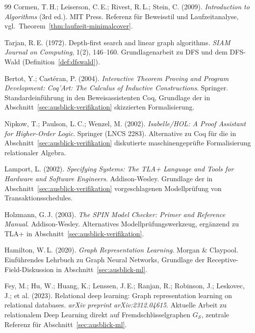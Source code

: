 ﻿\documentclass[a4paper,12pt]{report}
\theoremstyle{definition}
\theoremstyle{remark}
\begin{document}
\begin{thebibliography}{99}
Cormen, T.\,H.; Leiserson, C.\,E.; Rivest, R.\,L.; Stein, C. (2009).
\newblock \emph{Introduction to Algorithms} (3rd ed.).
\newblock MIT Press.
\newblock Referenz für Beweisstil und Laufzeitanalyse, vgl.\
Theorem~\ref{thm:laufzeit-minimalcover}.

Tarjan, R.\,E. (1972).
\newblock Depth-first search and linear graph algorithms.
\newblock \emph{SIAM Journal on Computing}, 1(2), 146--160.
\newblock Grundlagenarbeit zu DFS und dem DFS-Wald
(Definition~\ref{def:dfswald}).

Bertot, Y.; Castéran, P. (2004).
\newblock \emph{Interactive Theorem Proving and Program Development:
Coq'Art: The Calculus of Inductive Constructions}.
\newblock Springer.
\newblock Standardeinführung in den Beweisassistenten Coq, Grundlage
der in Abschnitt~\ref{sec:ausblick-verifikation} skizzierten
Formalisierung.

Nipkow, T.; Paulson, L.\,C.; Wenzel, M. (2002).
\newblock \emph{Isabelle/HOL: A Proof Assistant for Higher-Order Logic}.
\newblock Springer (LNCS 2283).
\newblock Alternative zu Coq für die in
Abschnitt~\ref{sec:ausblick-verifikation} diskutierte
maschinengeprüfte Formalisierung relationaler Algebra.

Lamport, L. (2002).
\newblock \emph{Specifying Systems: The TLA+ Language and Tools for
Hardware and Software Engineers}.
\newblock Addison-Wesley.
\newblock Grundlage der in Abschnitt~\ref{sec:ausblick-verifikation}
vorgeschlagenen Modellprüfung von Transaktionsschedules.

Holzmann, G.\,J. (2003).
\newblock \emph{The SPIN Model Checker: Primer and Reference Manual}.
\newblock Addison-Wesley.
\newblock Alternatives Modellprüfungswerkzeug, ergänzend zu TLA+ in
Abschnitt~\ref{sec:ausblick-verifikation}.


Hamilton, W.\,L. (2020).
\newblock \emph{Graph Representation Learning}.
\newblock Morgan \& Claypool.
\newblock Einführendes Lehrbuch zu Graph Neural Networks, Grundlage
der Receptive-Field-Diskussion in
Abschnitt~\ref{sec:ausblick-ml}.

Fey, M.; Hu, W.; Huang, K.; Lenssen, J.\,E.; Ranjan, R.; Robinson, J.;
Leskovec, J.; et al. (2023).
\newblock Relational deep learning: Graph representation learning on
relational databases.
\newblock \emph{arXiv preprint arXiv:2312.04615}.
\newblock Aktuelle Arbeit zu relationalem Deep Learning direkt auf
Fremdschlüsselgraphen $G_{\mathcal{S}}$, zentrale Referenz für
Abschnitt~\ref{sec:ausblick-ml}.


\end{thebibliography}
\end{document}
